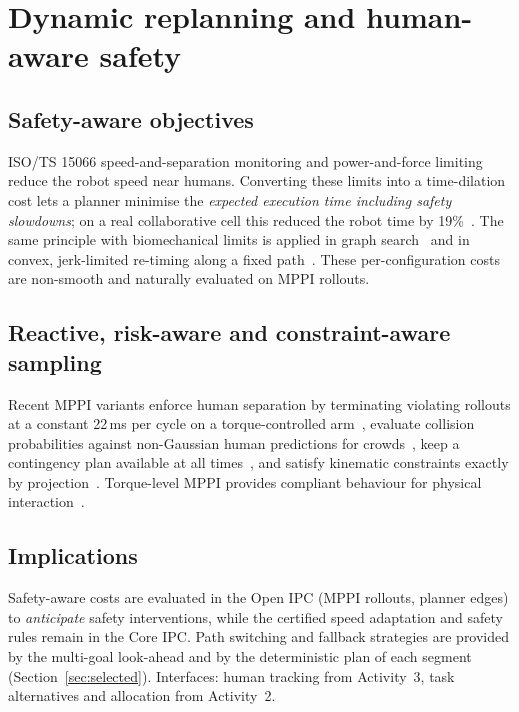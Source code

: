 \section{Dynamic replanning and human-aware safety}\label{sec:safety}

\subsection{Safety-aware objectives}
ISO/TS 15066 speed-and-separation monitoring and power-and-force limiting reduce the robot speed near humans. Converting these limits into a time-dilation cost lets a planner minimise the \emph{expected execution time including safety slowdowns}; on a real collaborative cell this reduced the robot time by 19\%~\cite{faroni2022safetyaware}. The same principle with biomechanical limits is applied in graph search~\cite{laha2023sstar} and in convex, jerk-limited re-timing along a fixed path~\cite{palleschi2021fastsafe}. These per-configuration costs are non-smooth and naturally evaluated on MPPI rollouts.

\subsection{Reactive, risk-aware and constraint-aware sampling}
Recent MPPI variants enforce human separation by terminating violating rollouts at a constant 22\,ms per cycle on a torque-controlled arm~\cite{gursoy2026cosmik}, evaluate collision probabilities against non-Gaussian human predictions for crowds~\cite{trevisan2025drampi}, keep a contingency plan available at all times~\cite{jung2024contingency}, and satisfy kinematic constraints exactly by projection~\cite{lee2026prmppi}. Torque-level MPPI provides compliant behaviour for physical interaction~\cite{im2026torquemppi}.

\subsection{Implications}
Safety-aware costs are evaluated in the Open IPC (MPPI rollouts, planner edges) to \emph{anticipate} safety interventions, while the certified speed adaptation and safety rules remain in the Core IPC. Path switching and fallback strategies are provided by the multi-goal look-ahead and by the deterministic plan of each segment (Section~\ref{sec:selected}). Interfaces: human tracking from Activity~3, task alternatives and allocation from Activity~2.
